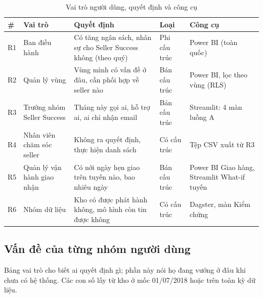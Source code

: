 \begin{table}[htbp]
\centering
\small
\caption{Vai trò người dùng, quyết định và công cụ}
\label{tab:roles}
\begin{tabularx}{\textwidth}{|>{\centering\arraybackslash}m{0.7cm}|>{\raggedright\arraybackslash}m{3.1cm}|L|>{\centering\arraybackslash}m{1.9cm}|>{\raggedright\arraybackslash}m{3.2cm}|}
\hline
\textbf{\#} & \textbf{Vai trò} & \textbf{Quyết định} & \textbf{Loại} & \textbf{Công cụ} \\
\hline
R1 & Ban điều hành & Có tăng ngân sách, nhân sự cho Seller Success không (theo quý) & Phi cấu trúc & Power BI (toàn quốc) \\
\hline
R2 & Quản lý vùng & Vùng mình có vấn đề ở đâu, cần phối hợp về seller nào & Bán cấu trúc & Power BI, lọc theo vùng (RLS) \\
\hline
R3 & Trưởng nhóm Seller Success & Tháng này gọi ai, hỗ trợ ai, ai chỉ nhận email & Bán cấu trúc & Streamlit: 4 màn luồng A \\
\hline
R4 & Nhân viên chăm sóc seller & Không ra quyết định, thực hiện danh sách & Có cấu trúc & Tệp CSV xuất từ R3 \\
\hline
R5 & Quản lý vận hành giao nhận & Có nới ngày hẹn giao trên tuyến nào, bao nhiêu ngày & Bán cấu trúc & Power BI Giao hàng, Streamlit What-if tuyến \\
\hline
R6 & Nhóm dữ liệu & Kho có được phát hành không, mô hình còn tin được không & Có cấu trúc & Dagster, màn Kiểm chứng \\
\hline
\end{tabularx}
\end{table}

\subsection{Vấn đề của từng nhóm người dùng}
Bảng vai trò cho biết ai quyết định gì; phần này nói họ đang vướng ở đâu khi chưa có hệ thống. Các con số lấy từ kho ở mốc 01/07/2018 hoặc trên toàn kỳ dữ liệu.

